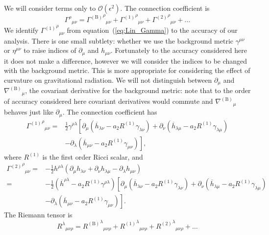 \documentclass[a4paper, 11pt, titlepage, twoside]{report}
\newcommand{\eqnref}[1]{equation~(\ref{eq:#1})}
\newcommand{\order}[1]{\ensuremath{\mathcal{O}({#1})}}
\begin{document}
We will consider terms only to $\order{\epsilon^2}$. The connection coefficient is
\begin{equation}
{\Gamma^\rho}_{\mu\nu} = {{\Gamma^{(\mathrm{B})}}^\rho}_{\mu\nu} + {{\Gamma^{(1)}}^\rho}_{\mu\nu} + {{\Gamma^{(2)}}^\rho}_{\mu\nu} + \ldots
\end{equation}
We identify ${{\Gamma^{(1)}}^\rho}_{\mu\nu}$ from \eqnref{Lin_Gamma} to the accuracy of our analysis. There is one small subtlety: whether we use the background metric $\gamma^{\mu\nu}$ or $\eta^{\mu\nu}$ to raise indices of $\partial_\mu$ and $h_{\mu\nu}$. Fortunately to the accuracy considered here it does not make a difference, however we will consider the indices to be changed with the background metric. This is more appropriate for considering the effect of curvature on gravitational radiation. We will not distinguish between $\partial_\mu$ and ${\nabla^{(\mathrm{B})}}_\mu$, the covariant derivative for the background metric: note that to the order of accuracy considered here covariant derivatives would commute and ${\nabla^{(\mathrm{B})}}_\mu$ behaves just like $\partial_\mu$. The connection coefficient has
\begin{align}
{{\Gamma^{(1)}}^\rho}_{\mu\nu} = {} & \frac{1}{2}\gamma^{\rho\lambda}\left[\partial_\mu \left(\overline{h}_{\lambda\nu} - a_2 R^{(1)}\gamma_{\lambda\nu}\right) + \partial_\nu \left(\overline{h}_{\lambda\mu} - a_2 R^{(1)}\gamma_{\lambda\mu}\right) \right. \nonumber \\
  & - \left. \partial_\lambda \left(\overline{h}_{\mu\nu} - a_2 R^{(1)}\gamma_{\mu\nu}\right)\right],
\end{align}
where $R^{(1)}$ is the first order Ricci scalar, and
\begin{align}
{{\Gamma^{(2)}}^\rho}_{\mu\nu} = {} & -\frac{1}{2}h^{\rho\lambda}(\partial_\mu h_{\lambda\nu} + \partial_\nu h_{\lambda\mu} - \partial_\lambda h_{\mu\nu}) \nonumber \\
 = {} & -\frac{1}{2}\left(\overline{h}^{\rho\lambda} - a_2 R^{(1)}\gamma^{\rho\lambda}\right)\left[\partial_\mu \left(\overline{h}_{\lambda\nu} - a_2 R^{(1)}\gamma_{\lambda\nu}\right) + \partial_\nu \left(\overline{h}_{\lambda\mu} - a_2 R^{(1)}\gamma_{\lambda\mu}\right) \right. \nonumber \\
 & - \left. \partial_\lambda \left(\overline{h}_{\mu\nu} - a_2 R^{(1)}\gamma_{\mu\nu}\right)\right].
\end{align}
The Riemann tensor is
\begin{equation}
{R^\lambda}_{\mu\nu\rho} = {{R^{(\mathrm{B})}}^\lambda}_{\mu\nu\rho} + {{R^{(1)}}^\lambda}_{\mu\nu\rho} + {{R^{(2)}}^\lambda}_{\mu\nu\rho} + \ldots
\end{equation}
\end{document}
